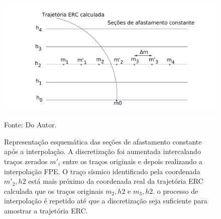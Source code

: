 \begin{figure}
\caption{Representação esquemática das seções de afastamento constante após a interpolação. A discretização foi aumentada
intercalando traços zerados $m'_i$ entre os traços originais e depois realizando a interpolação FPE. O traço sísmico 
identificado pela coordenada $m'_2, h2$ está mais próximo da coordenada real da trajetória ERC calculada que os traços 
originais $m_2, h2$ e $m_3, h2$. o processo de interpolação é repetido até que a discretização seja suficiente para amostrar a 
trajetória ERC.}
\begin{center}
\includegraphics[scale=0.15]{images/interpolacao.png}
\vspace{-0.3cm}
\end{center}
\begin{center}
 Fonte: Do Autor.
\end{center}
\label{fig:4.2}
\end{figure}

